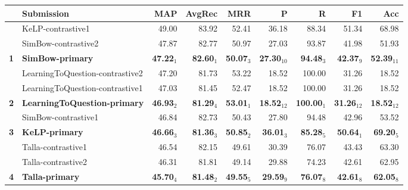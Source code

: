 \begin{table*}[tbh]
\begin{center}
\begin{tabular}{clrrrrrrr}
& \bf Submission & \bf MAP & \bf \scriptsize AvgRec & \bf \scriptsize MRR & \bf \scriptsize P & \bf \scriptsize R & \bf \scriptsize F1 & \bf \scriptsize Acc\\
\hline
& KeLP-contrastive1 & 49.00 & \scriptsize 83.92 & \scriptsize 52.41 & \scriptsize 36.18 & \scriptsize 88.34 & \scriptsize 51.34 & \scriptsize 68.98 \\
& SimBow-contrastive2 & 47.87 & \scriptsize 82.77 & \scriptsize 50.97 & \scriptsize 27.03 & \scriptsize 93.87 & \scriptsize 41.98 & \scriptsize 51.93 \\
\bf 1 & \bf SimBow-primary & \bf 47.22$_{1}$ & \bf \scriptsize 82.60$_{1}$ & \bf \scriptsize 50.07$_{3}$ & \bf \scriptsize 27.30$_{10}$ & \bf \scriptsize 94.48$_{3}$ & \bf \scriptsize 42.37$_{9}$ & \bf \scriptsize 52.39$_{11}$ \\
& LearningToQuestion-contrastive2 & 47.20 & \scriptsize 81.73 & \scriptsize 53.22 & \scriptsize 18.52 & \scriptsize 100.00 & \scriptsize 31.26 & \scriptsize 18.52 \\
& LearningToQuestion-contrastive1 & 47.03 & \scriptsize 81.45 & \scriptsize 52.47 & \scriptsize 18.52 & \scriptsize 100.00 & \scriptsize 31.26 & \scriptsize 18.52 \\
\bf 2 & \bf LearningToQuestion-primary & \bf 46.93$_{2}$ & \bf \scriptsize 81.29$_{4}$ & \bf \scriptsize 53.01$_{1}$ & \bf \scriptsize 18.52$_{12}$ & \bf \scriptsize 100.00$_{1}$ & \bf \scriptsize 31.26$_{12}$ & \bf \scriptsize 18.52$_{12}$ \\
& SimBow-contrastive1 & 46.84 & \scriptsize 82.73 & \scriptsize 50.43 & \scriptsize 27.80 & \scriptsize 94.48 & \scriptsize 42.96 & \scriptsize 53.52 \\
\bf 3 & \bf KeLP-primary & \bf 46.66$_{3}$ & \bf \scriptsize 81.36$_{3}$ & \bf \scriptsize 50.85$_{2}$ & \bf \scriptsize 36.01$_{3}$ & \bf \scriptsize 85.28$_{5}$ & \bf \scriptsize 50.64$_{1}$ & \bf \scriptsize 69.20$_{5}$ \\
& Talla-contrastive1 & 46.54 & \scriptsize 82.15 & \scriptsize 49.61 & \scriptsize 30.39 & \scriptsize 76.07 & \scriptsize 43.43 & \scriptsize 63.30 \\
& Talla-contrastive2 & 46.31 & \scriptsize 81.81 & \scriptsize 49.14 & \scriptsize 29.88 & \scriptsize 74.23 & \scriptsize 42.61 & \scriptsize 62.95 \\
\bf 4 & \bf Talla-primary & \bf 45.70$_{4}$ & \bf \scriptsize 81.48$_{2}$ & \bf \scriptsize 49.55$_{5}$ & \bf \scriptsize 29.59$_{9}$ & \bf \scriptsize 76.07$_{8}$ & \bf \scriptsize 42.61$_{8}$ & \bf \scriptsize 62.05$_{8}$ \\

\end{tabular}
\end{center}
\end{table*}
